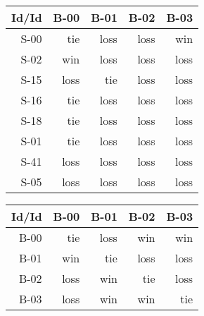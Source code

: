 \begin{tabular}{ | r | r | r | r | r | }
    \hline
        Id/Id  &   B-00  &   B-01  &   B-02  &   B-03  \\
    \hline
    \hline
         S-00  &    tie  &   loss  &   loss  &    win  \\
    \hline
         S-02  &    win  &   loss  &   loss  &   loss  \\
    \hline
         S-15  &   loss  &    tie  &   loss  &   loss  \\
    \hline
         S-16  &    tie  &   loss  &   loss  &   loss  \\
    \hline
         S-18  &    tie  &   loss  &   loss  &   loss  \\
    \hline
         S-01  &    tie  &   loss  &   loss  &   loss  \\
    \hline
         S-41  &   loss  &   loss  &   loss  &   loss  \\
    \hline
         S-05  &   loss  &   loss  &   loss  &   loss  \\
    \hline
\end{tabular}


\begin{tabular}{ | r | r | r | r | r | }
    \hline
        Id/Id  &   B-00  &   B-01  &   B-02  &   B-03  \\
    \hline
    \hline
         B-00  &    tie  &   loss  &    win  &    win  \\
    \hline
         B-01  &    win  &    tie  &   loss  &   loss  \\
    \hline
         B-02  &   loss  &    win  &    tie  &   loss  \\
    \hline
         B-03  &   loss  &    win  &    win  &    tie  \\
    \hline
\end{tabular}




